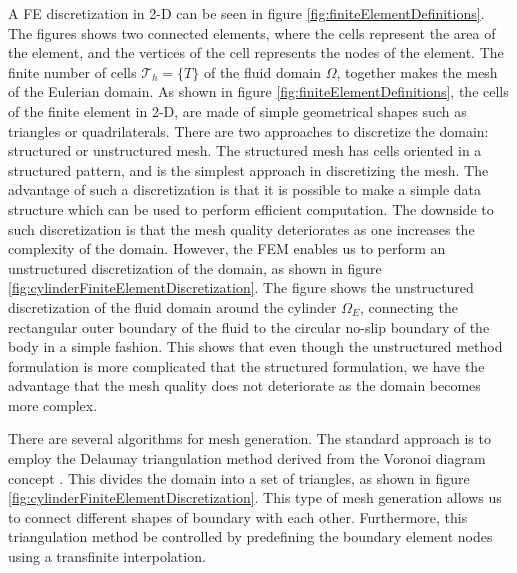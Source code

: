 A FE discretization in 2-D can be seen in figure \ref{fig:finiteElementDefinitions}. The figures shows two connected elements, where the cells represent the area of the element, and the vertices of the cell represents the nodes of the element. The finite number of cells $\mathcal{T}_h = \{T\}$ of the fluid domain $\Omega$, together makes the mesh of the Eulerian domain. As shown in figure \ref{fig:finiteElementDefinitions}, the cells of the finite element in 2-D, are made of simple geometrical shapes such as triangles or quadrilaterals. There are two approaches to discretize the domain: structured or unstructured mesh. The structured mesh has cells oriented in a structured pattern, and is the simplest approach in discretizing the mesh. The advantage of such a discretization is that it is possible to make a simple data structure which can be used to perform efficient computation. The downside to such discretization is that the mesh quality deteriorates as one increases the complexity of the domain. However, the FEM enables us to perform an unstructured discretization of the domain, as shown in figure \ref{fig:cylinderFiniteElementDiscretization}. The figure shows the unstructured discretization of the fluid domain around the cylinder $\Omega_E$, connecting the rectangular outer boundary of the fluid to the circular no-slip boundary of the body in a simple fashion. This shows that even though the unstructured method formulation is more complicated that the structured formulation, we have the advantage that the mesh quality does not deteriorate as the domain becomes more complex.

There are several algorithms for mesh generation. The standard approach is to employ the Delaunay triangulation method derived from the Voronoi diagram concept \cite{Carey1997}. This divides the domain into a set of triangles, as shown in figure \ref{fig:cylinderFiniteElementDiscretization}. This type of mesh generation allows us to connect different shapes of boundary with each other. Furthermore, this triangulation method be controlled by predefining the boundary element nodes using a transfinite interpolation.

